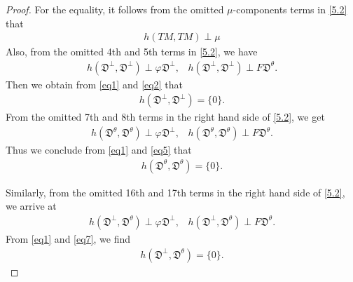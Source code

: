 \documentclass[reqno]{amsart}
\theoremstyle{plain}
\theoremstyle{remark}
\numberwithin{equation}{section}
\begin{document}
\begin{proof}
For the equality, it follows from the omitted $\mu$-components terms in \eqref{5.2} that\begin{align}\label{eq1}
h(TM, TM)\perp\mu
\end{align}
Also, from the omitted 4th and 5th terms in \eqref{5.2}, we have
\begin{align}\label{eq2}
h({\mathfrak{D}}^\perp, {\mathfrak{D}}^\perp)\perp \varphi{\mathfrak{D}}^\perp,\,\,\,\,\,h({\mathfrak{D}}^\perp, {\mathfrak{D}}^\perp)\perp F{\mathfrak{D}}^\theta.
\end{align}
Then  we obtain from \eqref{eq1} and \eqref{eq2} that
\begin{align}\label{eq3}
h({\mathfrak{D}}^\perp, {\mathfrak{D}}^\perp)=\{0\}.
\end{align}
From the omitted 7th and 8th terms in the right hand side of \eqref{5.2}, we get
\begin{align}\label{eq5}
h({\mathfrak{D}}^\theta, {\mathfrak{D}}^\theta)\perp \varphi{\mathfrak{D}}^\perp,\,\,\,\,\,h({\mathfrak{D}}^\theta, {\mathfrak{D}}^\theta)\perp F{\mathfrak{D}}^\theta.
\end{align}
Thus  we conclude from \eqref{eq1} and \eqref{eq5} that
\begin{align}\label{eq6}
h({\mathfrak{D}}^\theta, {\mathfrak{D}}^\theta)=\{0\}.
\end{align}

Similarly, from the omitted 16th and 17th terms in the right hand side of  \eqref{5.2}, we arrive at
\begin{align}\label{eq7}
h({\mathfrak{D}}^\perp, {\mathfrak{D}}^\theta)\perp\varphi{\mathfrak{D}}^\perp,\,\,\,\,\,h({\mathfrak{D}}^\perp, {\mathfrak{D}}^\theta)\perp F{\mathfrak{D}}^\theta.
\end{align}
From \eqref{eq1} and \eqref{eq7}, we find
\begin{align}\label{eq8}
h({\mathfrak{D}}^\perp, {\mathfrak{D}}^\theta)=\{0\}.
\end{align}


\end{proof}
\end{document}
